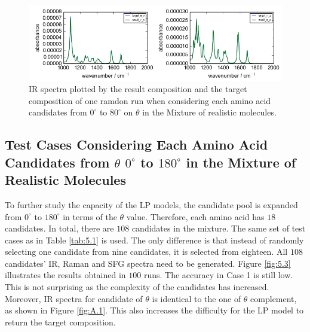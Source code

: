 \begin{figure}[!ht] 
\centering
\includegraphics[scale=0.7]{Figures/chapter5_result_target_residual_plotting__ir_result8_run1.png}
\caption{IR spectra plotted by the result composition and the target composition of one ramdon run when considering each amino acid candidates from $0^{\circ}$ to $80^{\circ}$ on $\theta$ in the Mixture of realistic molecules.} \label{fig:5.2}
\end{figure}

\subsection{Test Cases Considering Each Amino Acid Candidates from $\theta$ $0^{\circ}$ to $180^{\circ}$ in the Mixture of Realistic Molecules}
To further study the capacity of the LP models, the candidate pool is expanded from $0^{\circ}$ to $180^{\circ}$ in terms of the $\theta$ value. Therefore, each amino acid has $18$ candidates. In total, there are $108$ candidates in the mixture. The same set of test cases as in Table \ref{tab:5.1} is used. The only difference is that instead of randomly selecting one candidate from nine candidates, it is selected from eighteen. All $108$ candidates' IR, Raman and SFG spectra need to be generated. Figure \ref{fig:5.3} illustrates the results obtained in $100$ runs. The accuracy in Case 1 is still low. This is not surprising as the complexity of the candidates has increased. Moreover, IR spectra for candidate of $\theta$ is identical to the one of $\theta$ complement, as shown in Figure \ref{fig:A.1}. This also increases the difficulty for the LP model to return the target composition. \\

